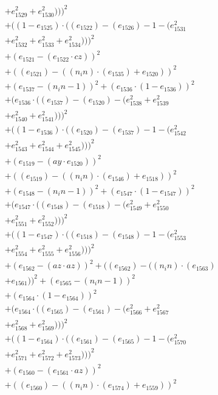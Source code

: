 \documentclass[10pt, a4paper]{article}
\begin{document}
\begin{align*}
& + e_{1529}^{2} + e_{1530}^{2})))^{2} \\
& + ((1 - e_{1525})  \cdot  ((e_{1522}) - (e_{1526}) - 1 - (e_{1531}^{2} \\
& + e_{1532}^{2} + e_{1533}^{2} + e_{1534}^{2})))^{2} \\
& + (e_{1521} - (e_{1522}  \cdot  cz))^{2} \\
& + ((e_{1521}) - ((n_in)  \cdot  (e_{1535}) + e_{1520}))^{2} \\
& + (e_{1537} - (n_in - 1))^{2} + (e_{1536}  \cdot  (1 - e_{1536}))^{2} \\
& + (e_{1536}  \cdot  ((e_{1537}) - (e_{1520}) - (e_{1538}^{2} + e_{1539}^{2} \\
& + e_{1540}^{2} + e_{1541}^{2})))^{2} \\
& + ((1 - e_{1536})  \cdot  ((e_{1520}) - (e_{1537}) - 1 - (e_{1542}^{2} \\
& + e_{1543}^{2} + e_{1544}^{2} + e_{1545}^{2})))^{2} \\
& + (e_{1519} - (ay  \cdot  e_{1520}))^{2} \\
& + ((e_{1519}) - ((n_in)  \cdot  (e_{1546}) + e_{1518}))^{2} \\
& + (e_{1548} - (n_in - 1))^{2} + (e_{1547}  \cdot  (1 - e_{1547}))^{2} \\
& + (e_{1547}  \cdot  ((e_{1548}) - (e_{1518}) - (e_{1549}^{2} + e_{1550}^{2} \\
& + e_{1551}^{2} + e_{1552}^{2})))^{2} \\
& + ((1 - e_{1547})  \cdot  ((e_{1518}) - (e_{1548}) - 1 - (e_{1553}^{2} \\
& + e_{1554}^{2} + e_{1555}^{2} + e_{1556}^{2})))^{2} \\
& + (e_{1562} - (az  \cdot  az))^{2} + ((e_{1562}) - ((n_in)  \cdot  (e_{1563}) \\
& + e_{1561}))^{2} + (e_{1565} - (n_in - 1))^{2} \\
& + (e_{1564}  \cdot  (1 - e_{1564}))^{2} \\
& + (e_{1564}  \cdot  ((e_{1565}) - (e_{1561}) - (e_{1566}^{2} + e_{1567}^{2} \\
& + e_{1568}^{2} + e_{1569}^{2})))^{2} \\
& + ((1 - e_{1564})  \cdot  ((e_{1561}) - (e_{1565}) - 1 - (e_{1570}^{2} \\
& + e_{1571}^{2} + e_{1572}^{2} + e_{1573}^{2})))^{2} \\
& + (e_{1560} - (e_{1561}  \cdot  az))^{2} \\
& + ((e_{1560}) - ((n_in)  \cdot  (e_{1574}) + e_{1559}))^{2} \\

\end{align*}
\end{document}
